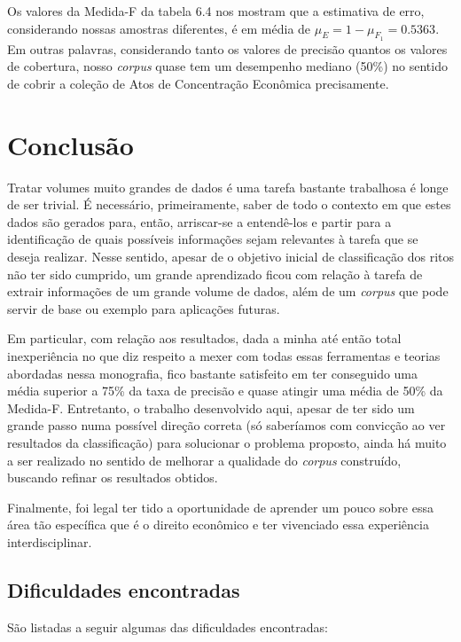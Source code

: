 \documentclass[11pt]{report}
\begin{document}
Os valores da Medida-F da tabela 6.4 nos mostram que a estimativa de erro, considerando nossas amostras diferentes, é em média de $\mu_{E} = 1 - \mu_{F_1} = 0.5363$. Em outras palavras,
considerando tanto os valores de precisão quantos os valores de cobertura, nosso \textit{corpus} quase tem um desempenho mediano (50\%) no sentido de cobrir a coleção de Atos de Concentração Econômica precisamente.

\pagebreak
\chapter{Conclusão}

\indent\indent Tratar volumes muito grandes de dados é uma tarefa bastante trabalhosa é longe de ser trivial. É necessário, primeiramente, saber de todo o contexto
em que estes dados são gerados para, então, arriscar-se a entendê-los e partir para a identificação de quais possíveis informações sejam relevantes à tarefa que se deseja realizar. Nesse sentido, apesar de o objetivo inicial de classificação dos ritos não ter sido cumprido, um grande
aprendizado ficou com relação à tarefa de extrair informações de um grande volume de dados, além de um \textit{corpus} que pode servir de base ou exemplo para aplicações futuras. 

Em particular, com relação aos resultados, dada a minha até então total inexperiência no que diz respeito a mexer com todas essas ferramentas e teorias abordadas nessa monografia, 
fico bastante satisfeito em ter conseguido uma  média superior a 75\% da taxa de precisão e quase atingir uma média de 50\% da Medida-F. Entretanto, o trabalho desenvolvido aqui, apesar de ter sido um grande passo numa possível direção correta (só saberíamos com convicção ao ver resultados da classificação) para solucionar o 
problema proposto, ainda há muito a ser realizado no sentido de melhorar a qualidade do \textit{corpus} construído, buscando refinar os resultados obtidos.

Finalmente, foi legal ter tido a oportunidade de aprender um pouco sobre essa área tão específica que é o direito econômico e ter vivenciado essa experiência interdisciplinar.

\section{Dificuldades encontradas}

\indent\indent São listadas a seguir algumas das dificuldades encontradas:
\end{document}
